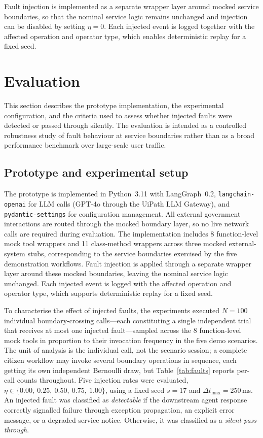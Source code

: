 \documentclass[3p,times,procedia]{elsarticle}
\begin{document}
Fault injection is implemented as a separate wrapper layer around mocked service boundaries, so that the nominal service logic remains unchanged and injection can be disabled by setting $\eta = 0$. Each injected event is logged together with the affected operation and operator type, which enables deterministic replay for a fixed seed.




\section{Evaluation}
\label{sec:evaluation}

This section describes the prototype implementation, the experimental configuration, and the criteria used to assess whether injected faults were detected or passed through silently. The evaluation is intended as a controlled robustness study of fault behaviour at service boundaries rather than as a broad performance benchmark over large-scale user traffic.

\subsection{Prototype and experimental setup}
\label{subsec:setup}

The prototype is implemented in Python~3.11 with LangGraph~0.2, \texttt{langchain-openai} for LLM calls (GPT-4o through the UiPath LLM Gateway), and \texttt{pydantic-settings} for configuration management. All external government interactions are routed through the mocked boundary layer, so no live network calls are required during evaluation. The implementation includes 8 function-level mock tool wrappers and 11 class-method wrappers across three mocked external-system stubs, corresponding to the service boundaries exercised by the five demonstration workflows. Fault injection is applied through a separate wrapper layer around these mocked boundaries, leaving the nominal service logic unchanged. Each injected event is logged with the affected operation and operator type, which supports deterministic replay for a fixed seed.

To characterise the effect of injected faults, the experiments executed $N = 100$ individual boundary-crossing calls---each constituting a single independent trial that receives at most one injected fault---sampled across the 8 function-level mock tools in proportion to their invocation frequency in the five demo scenarios. The unit of analysis is the individual call, not the scenario session; a complete citizen workflow may invoke several boundary operations in sequence, each getting its own independent Bernoulli draw, but Table~\ref{tab:faults} reports per-call counts throughout. Five injection rates were evaluated, $\eta \in \{0.00,\ 0.25,\ 0.50,\ 0.75,\ 1.00\}$, using a fixed seed $s = 17$ and $\Delta t_{\max} = 250$\,ms. An injected fault was classified as \emph{detectable} if the downstream agent response correctly signalled failure through exception propagation, an explicit error message, or a degraded-service notice. Otherwise, it was classified as a \emph{silent pass-through}.
\end{document}
